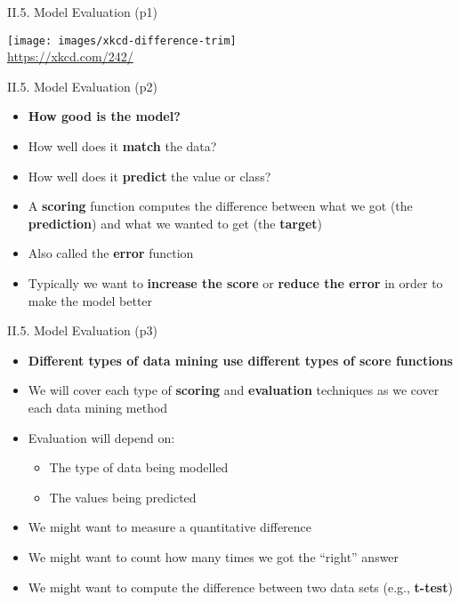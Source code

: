 \documentclass[handout]{beamer}
\newcommand{\strong}[1]{\textbf{\color{teal} #1}}
\newcommand{\stronger}[1]{\textbf{\color{purple} #1}}
\begin{document}
\begin{frame}{II.5. Model Evaluation (p1)}
\begin{center}
\texttt{[image: images/xkcd-difference-trim]}\\
{\footnotesize \url{https://xkcd.com/242/}}
\end{center}
\end{frame}
\begin{frame}{II.5. Model Evaluation (p2)}
\begin{itemize}
\item \stronger{How good is the model?}
\item How well does it \strong{match} the data?
\item How well does it \strong{predict} the value or class?
\item A \strong{scoring} function computes the difference between what we got (the \strong{prediction}) and what we wanted to get (the \strong{target})
\item Also called the \strong{error} function
\item Typically we want to \strong{increase the score} or \strong{reduce the error} in order to make the model better
\end{itemize}
\end{frame}
\begin{frame}{II.5. Model Evaluation (p3)}
\begin{itemize}
\item \stronger{Different types of data mining use different types of score functions}
\item We will cover each type of \strong{scoring} and \strong{evaluation} techniques as we cover each data mining method
\item Evaluation will depend on:
	\begin{itemize}
	\item The type of data being modelled
	\item The values being predicted
	\end{itemize}
\item We might want to measure a quantitative difference
\item We might want to count how many times we got the ``right'' answer
\item We might want to compute the difference between two data sets (e.g., \strong{t-test})
\end{itemize}
\end{frame}
\end{document}
